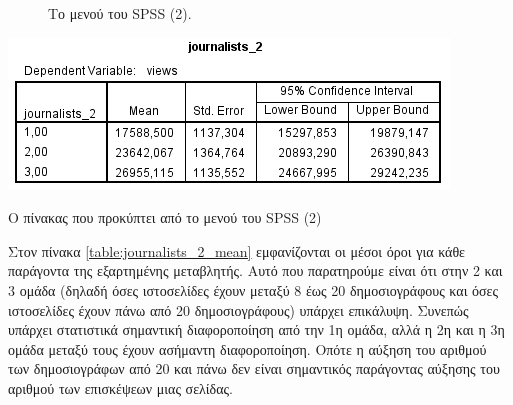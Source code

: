 \documentclass{assignment}
\begin{document}
\begin{Assignment}[Μέρος Δ]
\begin{figure}[htbp]
  \centering
  \caption{Το μενού  του SPSS (2).}
\label{fig:journalists_2_mean}
\end{figure}

\begin{table}[htbp]
\includegraphics[width=\textwidth]{images/table_journalists_2_mean.png}
\caption{Ο πίνακας που προκύπτει από το μενού  του SPSS (2) }
\label{table:journalists_2_mean}
\end{table}


Στον πίνακα \ref{table:journalists_2_mean} εμφανίζονται οι μέσοι όροι για κάθε παράγοντα της εξαρτημένης μεταβλητής. Αυτό που παρατηρούμε είναι ότι στην 2 και 3 ομάδα (δηλαδή όσες ιστοσελίδες έχουν μεταξύ 8 έως 20 δημοσιογράφους και όσες ιστοσελίδες έχουν πάνω από 20 δημοσιογράφους) υπάρχει επικάλυψη. Συνεπώς υπάρχει στατιστικά σημαντική διαφοροποίηση από την 1η ομάδα, αλλά η 2η και η 3η ομάδα μεταξύ τους έχουν ασήμαντη διαφοροποίηση. Οπότε η αύξηση του αριθμού των δημοσιογράφων από 20 και πάνω δεν είναι σημαντικός παράγοντας αύξησης του αριθμού των επισκέψεων μιας σελίδας.


\end{Assignment}
\end{document}
